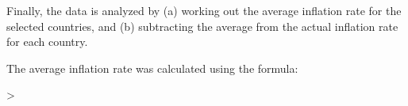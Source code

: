 \begin{center}
\end{center}

Finally, the data is analyzed by (a) working out the average inflation rate for the selected countries, and (b) subtracting the average from the actual inflation rate for each country.

The average inflation rate was calculated using the formula:

\begin{flushleft}
>
\end{flushleft}

